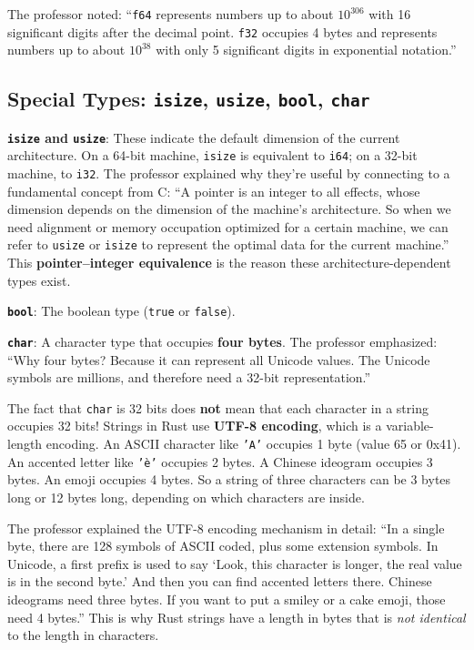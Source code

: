 The professor noted: ``\texttt{f64} represents numbers up to about $10^{306}$ with 16 significant digits after the decimal point. \texttt{f32} occupies 4 bytes and represents numbers up to about $10^{38}$ with only 5 significant digits in exponential notation.''

\subsection{Special Types: \texttt{isize}, \texttt{usize}, \texttt{bool}, \texttt{char}}

\textbf{\texttt{isize} and \texttt{usize}}: These indicate the default dimension of the current architecture. On a 64-bit machine, \texttt{isize} is equivalent to \texttt{i64}; on a 32-bit machine, to \texttt{i32}. The professor explained why they're useful by connecting to a fundamental concept from C: ``A pointer is an integer to all effects, whose dimension depends on the dimension of the machine's architecture. So when we need alignment or memory occupation optimized for a certain machine, we can refer to \texttt{usize} or \texttt{isize} to represent the optimal data for the current machine.'' This \textbf{pointer--integer equivalence} is the reason these architecture-dependent types exist.

\textbf{\texttt{bool}}: The boolean type (\texttt{true} or \texttt{false}).

\textbf{\texttt{char}}: A character type that occupies \textbf{four bytes}. The professor emphasized: ``Why four bytes? Because it can represent all Unicode values. The Unicode symbols are millions, and therefore need a 32-bit representation.''

\begin{warningbox}
The fact that \texttt{char} is 32 bits does \textbf{not} mean that each character in a string occupies 32 bits! Strings in Rust use \textbf{UTF-8 encoding}, which is a variable-length encoding. An ASCII character like \texttt{'A'} occupies 1 byte (value 65 or 0x41). An accented letter like \texttt{'è'} occupies 2 bytes. A Chinese ideogram occupies 3 bytes. An emoji occupies 4 bytes. So a string of three characters can be 3 bytes long or 12 bytes long, depending on which characters are inside.
\end{warningbox}

\begin{insightbox}
The professor explained the UTF-8 encoding mechanism in detail: ``In a single byte, there are 128 symbols of ASCII coded, plus some extension symbols. In Unicode, a first prefix is used to say `Look, this character is longer, the real value is in the second byte.' And then you can find accented letters there. Chinese ideograms need three bytes. If you want to put a smiley or a cake emoji, those need 4 bytes.'' This is why Rust strings have a length in bytes that is \emph{not identical} to the length in characters.
\end{insightbox}

